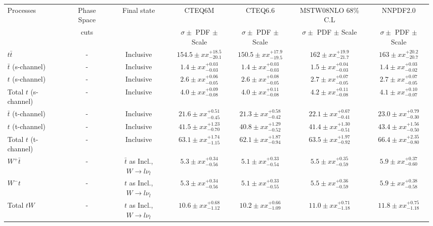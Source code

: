 \vspace{3mm}
\begin{table}[hbt]
\begin{center}
\renewcommand{\arraystretch}{1.2}
 {\footnotesize
\begin{tabular}{|l|c|c|c|c|c|c|}\hline
Processes & Phase Space & Final state & CTEQ6M  & CTEQ6.6 & MSTW08NLO 68\% C.L & NNPDF2.0  \\ 
 & cuts & & $\sigma \pm$ PDF $\pm$ Scale & $\sigma \pm$ PDF $\pm$ Scale & $ \sigma \pm$ PDF $\pm$ Scale &  $\sigma \pm$ PDF $\pm$ Scale \\ \hline
$t\bar{t}$ & - & Inclusive & $154.5 \pm xx ^{+18.5}_{-20.1}$ & $150.5 \pm xx ^{+17.9}_{-19.5}$ & $162 \pm xx ^{+19.9}_{-21.7}$ & $163 \pm xx ^{+20.2}_{-20.7}$  \\ \hline
$\bar{t}$ (s-channel) & - & Inclusive & $1.4 \pm xx ^{+0.03}_{-0.03}$ & $1.4 \pm xx ^{+0.03}_{-0.03}$ & $1.5 \pm xx ^{+0.04}_{-0.03}$ & $1.4 \pm xx ^{+0.03}_{-0.02}$ \\ \hline
$t$ (s-channel) & - & Inclusive & $2.6 \pm xx ^{+0.06}_{-0.05}$ & $2.6 \pm xx ^{+0.08}_{-0.05}$ & $2.7 \pm xx ^{+0.07}_{-0.05}$ & $2.7 \pm xx ^{+0.07}_{-0.05}$ \\ \hline
Total $t$ (s-channel) & - & Inclusive & $4.0 \pm xx ^{+0.09}_{-0.08}$ & $4.0 \pm xx ^{+0.11}_{-0.08}$ & $4.2 \pm xx ^{+0.11}_{-0.08}$ & $4.1 \pm xx ^{+0.10}_{-0.07}$ \\ \hline
$\bar{t}$ (t-channel) & - & Inclusive & $21.6 \pm xx ^{+0.51}_{-0.45}$ & $21.3 \pm xx ^{+0.58}_{-0.42}$ & $22.1 \pm xx ^{+0.67}_{-0.41}$ & $23.0 \pm xx ^{+0.79}_{-0.30}$  \\ \hline
$t$ (t-channel) & - & Inclusive & $41.5 \pm xx ^{+1.23}_{-0.70}$ & $40.8 \pm xx ^{+1.29}_{-0.52}$ & $41.4 \pm xx ^{+1.30}_{-0.51}$ & $43.4 \pm xx ^{+1.56}_{-0.50}$  \\ \hline
Total $t$ (t-channel) & - & Inclusive & $63.1 \pm xx ^{+1.74}_{-1.15}$ & $62.1 \pm xx ^{+1.87}_{-0.94}$ & $63.5 \pm xx ^{+1.97}_{-0.92}$ & $66.4 \pm xx ^{+2.35}_{-0.80}$ \\ \hline
$W^+ \bar{t}$ & - & $\bar{t}$ as Incl., $W\rightarrow l \nu_l$ & $5.3 \pm xx ^{+0.34}_{-0.56}$ & $5.1 \pm xx ^{+0.33}_{-0.54}$ & $5.5 \pm xx ^{+0.35}_{-0.59}$ & $5.9 \pm xx ^{+0.37}_{-0.60}$ \\ \hline
$W^- t$ & - & $t$ as Incl., $W\rightarrow l \nu_l$ & $5.3 \pm xx ^{+0.34}_{-0.56}$ & $5.1 \pm xx ^{+0.33}_{-0.55}$ & $5.5 \pm xx ^{+0.36}_{-0.59}$ & $5.9 \pm xx ^{+0.38}_{-0.58}$ \\ \hline
Total $tW$ & - & $t$ as Incl., $W\rightarrow l \nu_l$ & $10.6 \pm xx ^{+0.68}_{-1.12}$ & $10.2 \pm xx ^{+0.66}_{-1.09}$ & $11.0 \pm xx ^{+0.71}_{-1.18}$ & $11.8 \pm xx ^{+0.75}_{-1.18}$  \\ \hline

\end{tabular}}
\end{center}
\end{table}
